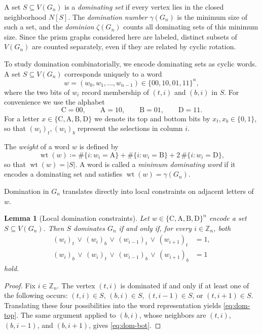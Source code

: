 \documentclass[11pt]{article}
\theoremstyle{plain}
\newtheorem{lemma}[theorem]{Lemma}
\theoremstyle{definition}
\theoremstyle{remark}
\newcommand{\ZZ}{\mathbb{Z}}
\DeclareMathOperator{\wt}{wt}
\newcommand{\colA}{\mathrm{A}}
\newcommand{\colB}{\mathrm{B}}
\newcommand{\colC}{\mathrm{C}}
\newcommand{\colD}{\mathrm{D}}
\begin{document}
A set $S\subseteq V(G_n)$ is a \emph{dominating set} if every vertex lies in the closed
neighborhood $N[S]$.  The \emph{domination number} $\gamma(G_n)$ is the minimum size of such a
set, and the \emph{dominion} $\zeta(G_n)$ counts all dominating sets of this minimum size.
Since the prism graphs considered here are labeled, distinct subsets of $V(G_n)$ are counted
separately, even if they are related by cyclic rotation.

To study domination combinatorially, we encode dominating sets as cyclic words.
A set $S\subseteq V(G_n)$ corresponds uniquely to a word
\[
w = (w_0,w_1,\dots,w_{n-1}) \in \{00,10,01,11\}^n,
\]
where the two bits of $w_i$ record membership of $(t,i)$ and $(b,i)$ in $S$.
For convenience we use the alphabet
\[
\colC=00,\qquad \colA=10,\qquad \colB=01,\qquad \colD=11.
\]
For a letter $x\in\{\colC,\colA,\colB,\colD\}$ we denote its top and bottom bits by
$x_t,x_b\in\{0,1\}$, so that $(w_i)_t,(w_i)_b$ represent the selections in column $i$.

The \emph{weight} of a word $w$ is defined by
\[
\wt(w)\coloneqq 
\#\{i:w_i=\colA\}+\#\{i:w_i=\colB\}+2\,\#\{i:w_i=\colD\},
\]
so that $\wt(w)=|S|$.  A word is called a \emph{minimum dominating word} if it encodes a
dominating set and satisfies $\wt(w)=\gamma(G_n)$.

Domination in $G_n$ translates directly into local constraints on adjacent letters of $w$.

\begin{lemma}[Local domination constraints]\label{lem:local-dom}
Let $w\in\{\colC,\colA,\colB,\colD\}^n$ encode a set $S\subseteq V(G_n)$.
Then $S$ dominates $G_n$ if and only if, for every $i\in\ZZ_n$, both
\begin{align}
\label{eq:dom-top}
(w_i)_t \,\vee\, (w_i)_b \,\vee\, (w_{i-1})_t \,\vee\, (w_{i+1})_t &= 1,\\
\label{eq:dom-bot}
(w_i)_b \,\vee\, (w_i)_t \,\vee\, (w_{i-1})_b \,\vee\, (w_{i+1})_b &= 1
\end{align}
hold.
\end{lemma}

\begin{proof}
Fix $i\in\ZZ_n$.  The vertex $(t,i)$ is dominated if and only if at least one of the following
occurs: $(t,i)\in S$, $(b,i)\in S$, $(t,i-1)\in S$, or $(t,i+1)\in S$.  Translating these four
possibilities into the word representation yields \eqref{eq:dom-top}.
The same argument applied to $(b,i)$, whose neighbors are $(t,i)$, $(b,i-1)$, and $(b,i+1)$,
gives \eqref{eq:dom-bot}.
\end{proof}
\end{document}
